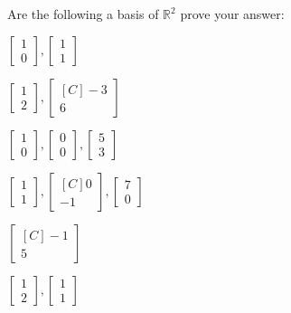 \begin{exercise}
Are the following a basis of $\mathbb{R}^2$ prove your answer:\\
\begin{inparaenum}[a)]
\item $\begin{bmatrix}1 \\ 0\end{bmatrix}, \begin{bmatrix}1 \\ 1\end{bmatrix}$ \hfill 
\item $\begin{bmatrix}1 \\ 2\end{bmatrix}, \begin{bmatrix*}[C]-3 \\ 6\end{bmatrix*}$ \hfill {} \\
\item $\begin{bmatrix}1 \\ 0\end{bmatrix}, \begin{bmatrix}0 \\ 0\end{bmatrix}, \begin{bmatrix}5 \\ 3\end{bmatrix}$ \hfill 
\item $\begin{bmatrix}1 \\ 1\end{bmatrix}, \begin{bmatrix*}[C]0 \\ -1\end{bmatrix*}, \begin{bmatrix}7 \\ 0\end{bmatrix}$ \hfill {} \\
\item $\begin{bmatrix*}[C]-1 \\ 5\end{bmatrix*}$ \hfill 
\item $\begin{bmatrix}1 \\ 2\end{bmatrix}, \begin{bmatrix}1 \\ 1\end{bmatrix}$ \hfill {} \\
\end{inparaenum}
\end{exercise}

